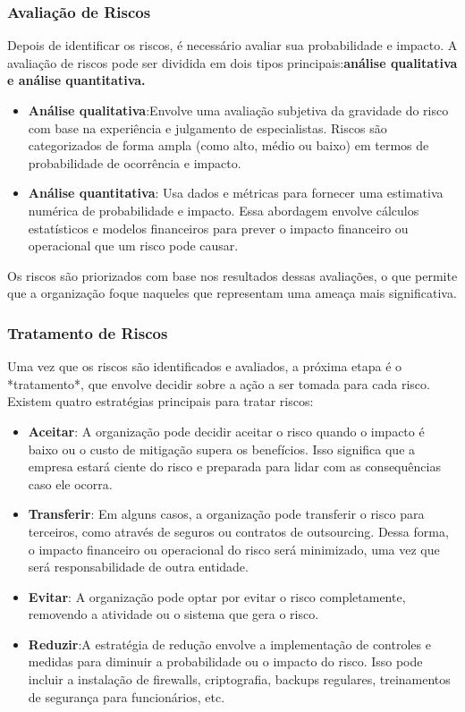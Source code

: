 \documentclass[12pt,oneside,a4paper,article]{abntex2}
\begin{document}
\subsubsection{Avaliação de Riscos}
{Depois de identificar os riscos, é necessário avaliar sua probabilidade e impacto. A avaliação de riscos pode ser dividida em dois tipos principais:\textbf{análise qualitativa e análise quantitativa.}}

\begin{itemize}
\item \textbf{Análise qualitativa}:Envolve uma avaliação subjetiva da gravidade do risco com base na experiência e julgamento de especialistas. Riscos são categorizados de forma ampla (como alto, médio ou baixo) em termos de probabilidade de ocorrência e impacto.
    \item \textbf{Análise quantitativa}: Usa dados e métricas para fornecer uma estimativa numérica de probabilidade e impacto. Essa abordagem envolve cálculos estatísticos e modelos financeiros para prever o impacto financeiro ou operacional que um risco pode causar.
\end{itemize}

{Os riscos são priorizados com base nos resultados dessas avaliações, o que permite que a organização foque naqueles que representam uma ameaça mais significativa.}

\subsubsection{Tratamento de Riscos}

{Uma vez que os riscos são identificados e avaliados, a próxima etapa é o *tratamento*, que envolve decidir sobre a ação a ser tomada para cada risco. Existem quatro estratégias principais para tratar riscos:}

\begin{itemize}
    \item \textbf{Aceitar}: A organização pode decidir aceitar o risco quando o impacto é baixo ou o custo de mitigação supera os benefícios. Isso significa que a empresa estará ciente do risco e preparada para lidar com as consequências caso ele ocorra.
    \item \textbf{Transferir}: Em alguns casos, a organização pode transferir o risco para terceiros, como através de seguros ou contratos de outsourcing. Dessa forma, o impacto financeiro ou operacional do risco será minimizado, uma vez que será responsabilidade de outra entidade.
    \item \textbf{Evitar}: A organização pode optar por evitar o risco completamente, removendo a atividade ou o sistema que gera o risco.
    \item \textbf{Reduzir}:A estratégia de redução envolve a implementação de controles e medidas para diminuir a probabilidade ou o impacto do risco. Isso pode incluir a instalação de firewalls, criptografia, backups regulares, treinamentos de segurança para funcionários, etc.
\end{itemize}
\end{document}
